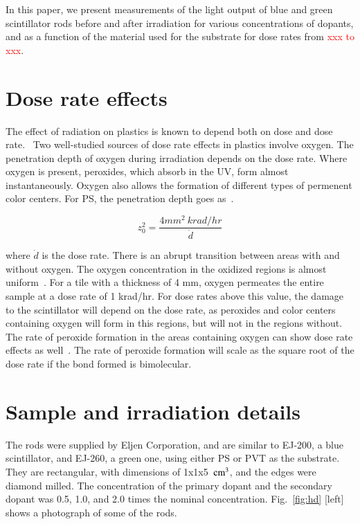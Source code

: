\documentclass[review]{elsarticle}
\begin{document}
In this paper, we present measurements of the light output 
of blue and green scintillator rods 
before and after irradiation for various concentrations of dopants, and
as a function of the material used for the substrate
for dose rates from \textcolor{red}{xxx to xxx}.


\section{Dose rate effects}

The effect of radiation on plastics is known to depend
both on dose and dose rate.~\cite{sauli,34504,Wick1991472,289295,173180,173178,Giokaris1993315,gillen,1748-0221-11-10-T10004,clough1,bolland1,bolland2,bateman,cunliffe,Biagtan1996125}
Two well-studied
sources of dose rate effects in plastics
involve oxygen.   The penetration depth of oxygen
during irradiation depends on the dose rate.
Where oxygen is present, peroxides, which absorb in the UV,
form almost instantaneously.  Oxygen also allows the formation
of different types of permenent color centers.
For PS, the penetration depth goes as~\cite{Wick1991472,cloughPS}.
\begin{linenomath}
\begin{equation}
z_0^2=\frac{4 mm^2~ krad/hr}{\dot{d}}
\label{eqn:z0}
\end{equation}
\end{linenomath}
where $\dot{d}$ is the dose rate.
There is an abrupt transition between areas with and without oxygen.  The
oxygen  concentration
in the oxidized regions is almost uniform~\cite{clough2}.
For a tile with a thickness of 4 mm, oxygen permeates the entire sample at
a dose rate of 1 krad/hr.
For dose rates above this value, the damage to the scintillator
will depend on the dose rate, as peroxides and color centers containing oxygen will
form in this regions,
but will not in the regions without.
The rate of peroxide
formation in the areas containing oxygen can show dose rate effects as well~\cite{clough2}.
The rate of peroxide formation will scale as the
square root of  the dose rate if the bond formed is bimolecular.


\section{Sample and irradiation details}
The rods were supplied by Eljen Corporation, and
are similar to EJ-200, a blue scintillator, and EJ-260, a green one, using either
PS or PVT as the substrate.
They are rectangular, with dimensions of 1x1x5~$\rm{cm^3}$, 
and the edges were diamond milled.
The concentration of the primary dopant and the secondary dopant
was 0.5, 1.0, and 2.0 times the nominal concentration.
Fig.~\ref{fig:hd} [left] shows a photograph of some of the rods.
\end{document}
